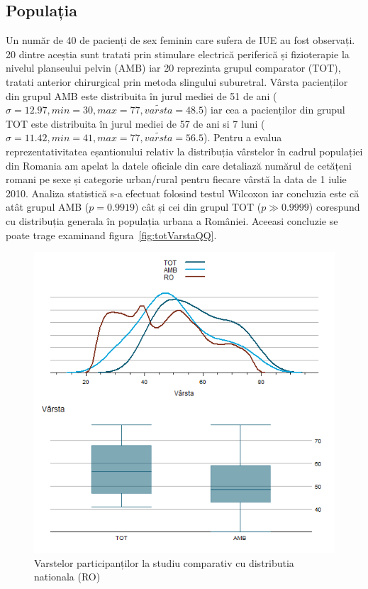 \documentclass[12pt,draft]{article}
\begin{document}
\subsection{Populația}
 \label{rezPop}
  Un număr de 40 de pacienți de sex feminin care sufera de \ac{IUE} au fost observați. 20 dintre aceștia sunt tratati prin stimulare electrică periferică și fizioterapie la nivelul planseului pelvin (AMB) iar 20 reprezinta grupul comparator (TOT), tratati anterior chirurgical prin metoda slingului suburetral.
  Vârsta pacienților din grupul AMB este distribuita în jurul mediei de 51 de ani ($\sigma=12.97,min=30,max=77,\tilde{varsta}=48.5$) iar cea a pacienților din grupul TOT este distribuita în jurul mediei de 57 de ani si 7 luni ($\sigma=11.42,min=41,max=77,\tilde{varsta}=56.5$).
  Pentru a evalua reprezentativitatea eșantionului relativ la distribuția vârstelor în cadrul populației din Romania am apelat la datele oficiale din \citep{insee2011} care detaliază numărul de cetățeni romani pe sexe și categorie urban/rural pentru fiecare vârstă la data de 1 iulie 2010. 
  Analiza statistică s-a efectuat folosind testul Wilcoxon iar concluzia este că atât grupul AMB ($p=0.9919$) cât și cei din grupul TOT ($p\gg0.9999$) corespund cu distribuția generala în populația urbana a României. Aceeasi concluzie se poate trage examinand figura~\ref{fig:totVarstaQQ}.
  \begin{figure}[H]
   \centering
   \includegraphics[width=0.8\linewidth]{totVarstaGrup}
   \caption{Varstelor participanților la studiu comparativ cu distributia nationala (RO)}
   \label{fig:totVarstaGrup}
  \end{figure}
\end{document}
